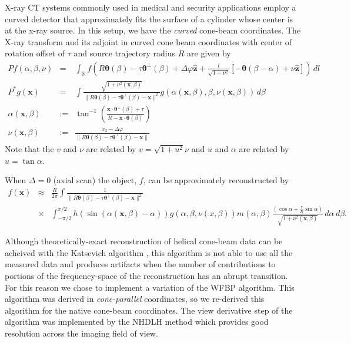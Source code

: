 \documentclass[11pt]{article}
\begin{document}
X-ray CT systems commonly used in medical and security applications employ a curved detector that approximately fits the surface of a cylinder whose center is at the x-ray source.  In this setup, we have the \textit{curved} cone-beam coordinates.  The X-ray transform and its adjoint in curved cone beam coordinates with center of rotation offset of $\tau$ and source trajectory radius $R$ are given by
\begin{eqnarray*}
Pf(\alpha,\beta,\nu) &=& \int_\mathbb{R} f\left(R\bm{\theta}(\beta) - \tau\bm{\theta}^\perp(\beta) + \Delta\varphi\widehat{\bm{z}} + \frac{l}{\sqrt{1+\nu^2}}\left[-\bm{\theta}(\beta-\alpha) + \nu\widehat{\bm{z}} \right] \right) \, dl \\
P^*g(\bm{x}) &=& \int \frac{\sqrt{1+\nu^2(\bm{x},\beta)}}{\| R\bm{\theta}(\beta) - \tau\bm{\theta}^\perp(\beta) - \bm{x} \|^2}  g\left(\alpha(\bm{x},\beta), \beta, \nu(\bm{x},\beta)\right) \, d\beta \\
\alpha(\bm{x},\beta) &:=& \tan^{-1}\left( \frac{\bm{x}\cdot \bm{\theta}^\perp(\beta) + \tau}{R - \bm{x}\cdot\bm{\theta}(\beta)} \right) \\
\nu(\bm{x},\beta) &:=& \frac{x_3 - \Delta\varphi}{\|R\bm{\theta}(\beta) - \tau\bm{\theta}^\perp(\beta) - \bm{x} \|}
\end{eqnarray*}
Note that the $v$ and $\nu$ are related by $v = \sqrt{1+u^2}\nu$ and $u$ and $\alpha$ are related by $u = \tan\alpha$.

When $\Delta = 0$ (axial scan) the object, $f$, can be approximately reconstructed by
\begin{eqnarray*}
f(\bm{x}) &\approx& \frac{R}{2\pi} \int \frac{1}{\| R\bm{\theta}(\beta) - \tau\bm{\theta}^\perp(\beta) - \bm{x} \|^2} \\ &\times& \int_{-\pi/2}^{\pi/2} h(\sin(\alpha(\bm{x},\beta) - \alpha)) g(\alpha, \beta, \nu(x,\beta)) m(\alpha, \beta) \frac{\left(\cos\alpha + \frac{\tau}{R}\sin\alpha\right)}{\sqrt{1+\nu^2(\bm{x},\beta)}} \, d\alpha \, d\beta.
\end{eqnarray*}

Although theoretically-exact reconstruction of helical cone-beam data can be acheived with the Katsevich algorithm \cite{Katsevich_SIAM_2002}, this algorithm is not able to use all the measured data and produces artifacts when the number of contributions to portions of the frequency-space of the reconstruction has an abrupt transition.  For this reason we chose to implement a variation of the WFBP \cite{WFBP} algorithm.  This algorithm was derived in \textit{cone-parallel} coordinates, so we re-derived this algorithm for the native cone-beam coordinates.  The view derivative step of the algorithm was implemented by the NHDLH \cite{NHDLH_PMB_2007} method which provides good resolution across the imaging field of view.
\end{document}
